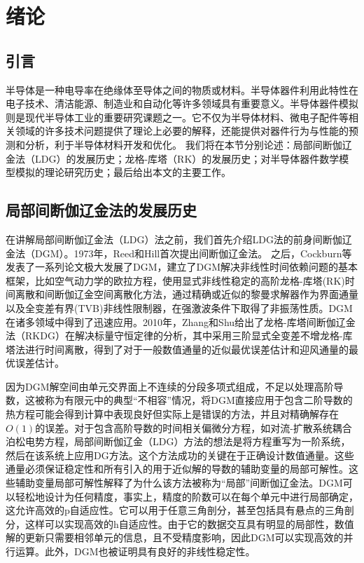 \cleardoublepage

\section{绪论}

\subsection{引言}
半导体是一种电导率在绝缘体至导体之间的物质或材料。半导体器件利用此特性在电子技术、清洁能源、制造业和自动化等许多领域具有重要意义。半导体器件模拟则是现代半导体工业的重要研究课题之一。它不仅为半导体材料、微电子配件等相关领域的许多技术问题提供了理论上必要的解释，还能提供对器件行为与性能的预测和分析，利于半导体材料开发和优化。
我们将在本节分别论述：局部间断伽辽金法（LDG）的发展历史；龙格-库塔（RK）的发展历史；对半导体器件数学模型模拟的理论研究历史；最后给出本文的主要工作。
\subsection{局部间断伽辽金法的发展历史}
在讲解局部间断伽辽金法（LDG）法之前，我们首先介绍LDG法的前身间断伽辽金法（DGM）。1973年，Reed和Hill首次提出间断伽辽金法\cite{reed1973triangular}。
之后，Cockburn等发表了一系列论文极大发展了DGM，建立了DGM解决非线性时间依赖问题的基本框架\cite{reed1973triangular,cockburn1991runge,cockburn1989tvb2,cockburn1989tvb3,cockburn1990runge,cockburn1998runge}，比如空气动力学的欧拉方程，使用显式非线性稳定的高阶龙格-库塔(RK)时间离散和间断伽辽金空间离散化方法，通过精确或近似的黎曼求解器作为界面通量以及全变差有界(TVB)非线性限制器，在强激波条件下取得了非振荡性质。DGM在诸多领域中得到了迅速应用\cite{cockburn2000development}。2010年，Zhang和Shu给出了龙格-库塔间断伽辽金法（RKDG）在解决标量守恒定律的分析，其中采用三阶显式全变差不增龙格-库塔法进行时间离散，得到了对于一般数值通量的近似最优误差估计和迎风通量的最优误差估计\cite{zhang2010stabilitya}。

因为DGM解空间由单元交界面上不连续的分段多项式组成，不足以处理高阶导数，这被称为有限元中的典型“不相容”情况，将DGM直接应用于包含二阶导数的热方程可能会得到计算中表现良好但实际上是错误的方法，并且对精确解存在$O(1)$的误差\cite{cockburn2001runge,zhang2003analysis}。对于包含高阶导数的时间相关偏微分方程，如对流-扩散系统耦合泊松电势方程，局部间断伽辽金（LDG）方法的想法是将方程重写为一阶系统，然后在该系统上应用DG方法。这个方法成功的关键在于正确设计数值通量。这些通量必须保证稳定性和所有引入的用于近似解的导数的辅助变量的局部可解性。这些辅助变量局部可解性解释了为什么该方法被称为“局部”间断伽辽金法\cite{cockburn1998local}。DGM可以轻松地设计为任何精度，事实上，精度的阶数可以在每个单元中进行局部确定，这允许高效的p自适应性。它可以用于任意三角剖分，甚至包括具有悬点的三角剖分，这样可以实现高效的h自适应性。由于它的数据交互具有明显的局部性，数值解的更新只需要相邻单元的信息，且不受精度影响，因此DGM可以实现高效的并行运算。此外，DGM也被证明具有良好的非线性稳定性。

